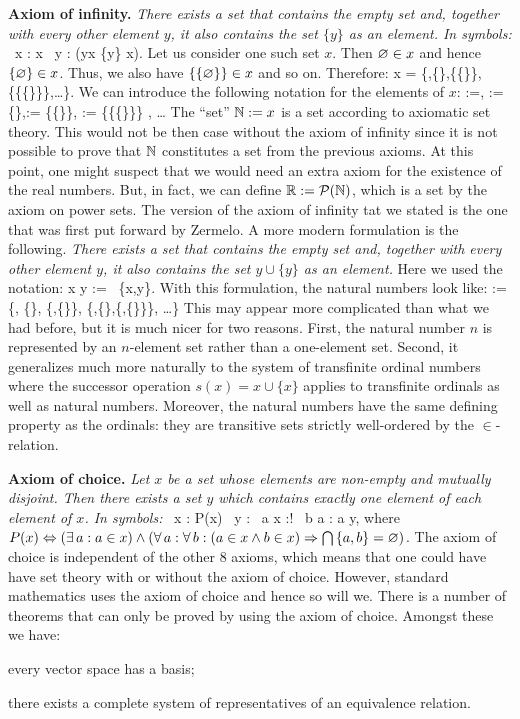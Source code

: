 \textbf{Axiom of infinity.} \emph{There exists a set that contains the empty set and,  together with every other element $y$, it also contains the set $\{y\}$ as an element. In symbols:}
\bse
\exists \, x : \vn \in x \land \forall \, y : (y\in x \imp \{y\} \in x).
\ese
Let us consider one such set $x$. Then $\varnothing \in x$ and hence $\{\varnothing\}\in x$. Thus, we also have $\{\{\varnothing\}\}\in x$ and so on. Therefore:
\bse
x = \{\vn,\{\vn\},\{\{\vn\}\},\{\{\{\vn\}\}\},\ldots\}.
\ese
We can introduce the following notation for the elements of $x$:
 :=\vn ,   := \{\vn\},:= \{\{\vn\}\}, := \{\{\{\vn\}\}\} , \quad \ldots
\ese
\bc
The ``set'' $\mathbb{N}:=x$\index{$\N$} is a set according to axiomatic set theory.
\ec
This would not be then case without the axiom of infinity since it is not possible to prove that $\N$ constitutes a set from the previous axioms.
\br
At this point, one might suspect that we would need an extra axiom for the existence of the real numbers. But, in fact, we can define $\mathbb{R} := \mathcal{P}(\mathbb{N})$, which is a set by the axiom on power sets.
\er
\br
The version of the axiom of infinity tat we stated is the one that was first put forward by Zermelo. A more modern formulation is the following. \emph{There exists a set that contains the empty set and, together with every other element $y$, it also contains the set $y\cup\{y\}$ as an element.} Here we used the notation:
\bse
x \cup y := \bigcup \, \{x,y\}.
\ese
With this formulation, the natural numbers look like:
\bse
\N := \{\vn, \{\vn\}, \{\vn,\{\vn\}\}, \{\vn,\{\vn\},\{\vn,\{\vn\}\}\}, \ldots \}
\ese
This may appear more complicated than what we had before, but it is much nicer for two reasons.  First, the natural number $n$ is represented by an $n$-element set rather than a one-element set. Second, it generalizes much more naturally to the system of transfinite ordinal numbers where the successor operation $s(x)=x\cup\{x\}$ applies to transfinite ordinals as well as natural numbers. Moreover, the natural numbers have the same defining property as the ordinals: they are transitive sets strictly well-ordered by the $\in$-relation.
\er

\textbf{Axiom of choice.} \emph{Let $x$ be a set whose elements are non-empty and mutually disjoint. Then there exists a set $y$ which contains exactly one element of each element of $x$. In symbols:}
\bse
\forall \, x : P(x) \imp \exists \, y : \forall \, a \in x :\exists! \, b \in a : a \in y,
\ese
where $P(x) \Leftrightarrow (\exists \,a : a \in x) \land (\forall \, a : \forall \, b : (a\in x \land b \in x) \Rightarrow \bigcap \, \{a,b\} = \varnothing )$.
\br
The axiom of choice is independent of the other 8 axioms, which means that one could have have set theory with or without the axiom of choice. However, standard mathematics uses the axiom of choice and hence so will we. There is a number of theorems that can only be proved by using the axiom of choice. Amongst these we have:
\bit
\item every vector space has a basis;
\item there exists a complete system of representatives of an equivalence relation.
\eit
\er

